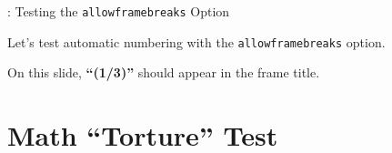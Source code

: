 \begin{frame}[allowframebreaks]{\titleprefix: Testing the \texttt{allowframebreaks} Option}

\renewcommand{\blindmarkup}[1]{\emph{#1}}

Let's test automatic numbering with the \texttt{allowframebreaks} option.

On this slide, \textbf{``(1/3)''} should appear in the frame title.

\blindtext

\parstart{\framebreak}
\Blindtext[2]

\end{frame}


\section{Math ``Torture'' Test}


\begin{frame}[allowframebreaks]{\insertsection}



\end{frame}






\section{\refname}

\begin{frame}[allowframebreaks]{\insertsection}

\begin{refcontext}[sorting=nyt]
\printbibliography[heading=none]
\end{refcontext}

%
%

\end{frame}






